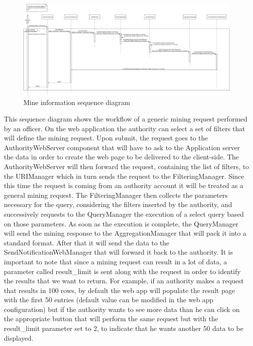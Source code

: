 \begin{figure}[H]
  \centering
  \includegraphics[width=1\textwidth]{Images/UML_diagrams/Sequence_Diagrams/Mine_information_sd.png}
  \caption{Mine information sequence diagram}
  \label{fig:mine_info_sd}
\end{figure}
This sequence diagram shows the workflow of a generic mining request performed by an officer. On the web application the authority can select a set of filters that will define the mining request. Upon submit, the request goes to the AuthorityWebServer component that will have to ask to the Application server the data in order to create the web page to be delivered to the client-side. The AuthorityWebServer will then forward the request, containing the list of filters, to the URIManager which in turn sends the request to the FilteringManager. Since this time the request is coming from an authority account it will be treated as a general mining request. The FilteringManager then collects the parameters necessary for the query, considering the filters inserted by the authority, and successively requests to the QueryManager the execution of a select query based on those parameters. As soon as the execution is complete, the QueryManager will send the mining response to the AggregationManager that will pack it into a standard format. After that it will send the data to the SendNotificationWebManager that will forward it back to the authority. It is important to note that since a mining request can result in a lot of data, a parameter called result\_limit is sent along with the request in order to identify the results that we want to return. For example, if an authority makes a request that results in 100 rows, by default the web app will populate the result page with the first 50 entries (default value can be modified in the web app configuration) but if the authority wants to see more data than he can click on the appropriate button that will perform the same request but with the result\_limit parameter set to 2, to indicate that he wants another 50 data to be displayed. 
